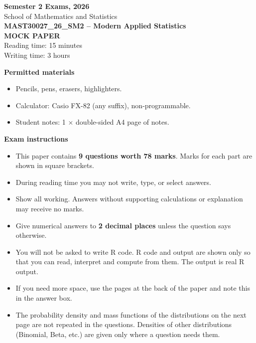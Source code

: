 \documentclass[11pt,a4paper]{article}
\begin{document}
\thispagestyle{empty}
\begin{center}

\vspace{1.2cm}
{\Large\bfseries Semester 2 Exams, 2026}\\[6pt]
{\large School of Mathematics and Statistics}\\[1.2cm]
{\LARGE\bfseries MAST30027\_26\_SM2 -- Modern Applied Statistics}\\[1.0cm]
{\Large \textbf{MOCK PAPER}}\\[1.0cm]
{\large Reading time: 15 minutes\\[4pt] Writing time: 3 hours}
\end{center}
\vspace{1.0cm}

\textbf{Permitted materials}
\begin{itemize}[itemsep=1pt,topsep=2pt]
\item Pencils, pens, erasers, highlighters.
\item Calculator: Casio FX-82 (any suffix), non-programmable.
\item Student notes: 1 $\times$ double-sided A4 page of notes.
\end{itemize}

\textbf{Exam instructions}
\begin{itemize}[itemsep=1pt,topsep=2pt]
\item This paper contains \textbf{9 questions worth 78 marks}. Marks for each part are shown in square brackets.
\item During reading time you may not write, type, or select answers.
\item Show all working. Answers without supporting calculations or explanation may receive no marks.
\item Give numerical answers to \textbf{2 decimal places} unless the question says otherwise.
\item You will not be asked to write R code. R code and output are shown only so that you can read, interpret and compute from them. The output is real R output.
\item If you need more space, use the pages at the back of the paper and note this in the answer box.
\item The probability density and mass functions of the distributions on the next page are not repeated in the questions. Densities of other distributions (Binomial, Beta, etc.) are given only where a question needs them.
\end{itemize}
\end{document}
